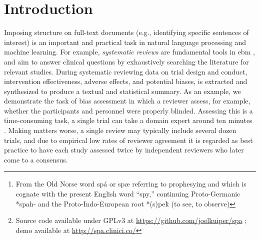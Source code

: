 \documentclass[runningheads,a4paper]{llncs}
\begin{document}
\begin{abstract}
Summarizing the evidence about medical interventions is an immense undertaking.
In part this is because unstructured \ac{pdf} documents remain the main vehicle for disseminating the results of clinical trials.
Clinicians and researchers typically manually extract and synthesise information from these \acp{pdf} which is then published as a \emph{systematic review}.
We introduce Spá\footnote{From the Old Norse word spá or spæ referring to prophesying and which is cognate with the present English word “spy,” continuing Proto-Germanic *spah- and the Proto-Indo-European root *(s)pe\`{k} (to see, to observe)}\footnote{Source code available under GPLv3 at \url{https://github.com/joelkuiper/spa} \cite{kuiper2014}; demo available at \url{http://spa.clinici.co/}}, a web-based \ac{pdf} viewer that allows for annotation and summarisation \acl{ml} modules to semi-automate the task of \ac{pdf} annotation and summarisation.
To illustrate, we demonstrate the use of Spá to semi-automate the assessment of bias in clinical trials.
Spá can visualize the output from hybrid models that simultaneously classify documents (e.g., identifying trials as low risk of various biases), and also annotates sentences or words that contribute most to the classification.
The Spá architecture is modular, and new models may be trivially added, thus the tool made be widely useful in other domains with a \ac{pdf}-based literature, including law, physics, and biology.
\end{abstract}

\acresetall
{}

\section{Introduction}
\label{section:intro}

Imposing structure on full-text documents (e.g., identifying specific sentences of interest) is an important and practical task in natural language processing and machine learning.
For example, \emph{systematic reviews} are fundamental tools in \ac{ebm} \cite{sackett1996}, and aim to answer clinical questions by exhaustively searching the literature for relevant studies.
During systematic reviewing data on trial design and conduct, intervention effectiveness, adverse effects, and potential biases, is extracted and synthesized to produce a textual and statistical summary.
As an example, we demonstrate the task of bias assessment in which a reviewer assess, for example, whether the participants and personnel were properly blinded.
Assessing this is a time-consuming task, a single trial can take a domain expert around ten minutes \cite{Hartling2011}.
Making matters worse, a single review may typically include several dozen trials, and due to empirical low rates of reviewer agreement it is regarded as best practice to have each study assessed twice by independent reviewers who later come to a consensus\cite{Hartling2009}.
\end{document}
